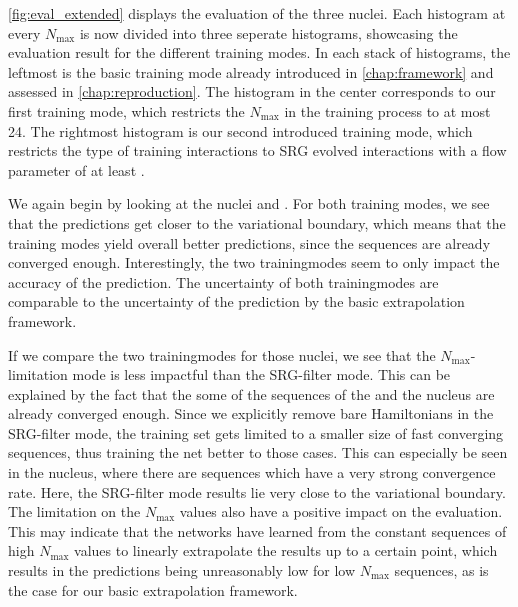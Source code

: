 \autoref{fig:eval_extended} displays the evaluation of the three nuclei. Each histogram at every $N_\mathrm{max}$ is now divided into three seperate histograms, showcasing the evaluation result for the different training modes. In each stack of histograms, the leftmost is the basic training mode already introduced in \autoref{chap:framework} and assessed in \autoref{chap:reproduction}. The histogram in the center corresponds to our first training mode, which restricts the $N_\mathrm{max}$ in the training process to at most 24. The rightmost histogram is our second introduced training mode, which restricts the type of training interactions to SRG evolved interactions with a flow parameter of at least .

We again begin by looking at the nuclei  and . For both training modes, we see that the predictions get closer to the variational boundary, which means that the training modes yield overall better predictions, since the sequences are already converged enough. Interestingly, the two trainingmodes seem to only impact the accuracy of the prediction. The uncertainty of both trainingmodes are comparable to the uncertainty of the prediction by the basic extrapolation framework.

If we compare the two trainingmodes for those nuclei, we see that the $N_\mathrm{max}$-limitation mode is less impactful than the SRG-filter mode. This can be explained by the fact that the some of the sequences of the  and the  nucleus are already converged enough. Since we explicitly remove bare Hamiltonians in the SRG-filter mode, the training set gets limited to a smaller size of fast converging sequences, thus training the net better to those cases. This can especially be seen in the  nucleus, where there are sequences which have a very strong convergence rate. Here, the SRG-filter mode results lie very close to the variational boundary. The limitation on the $N_\mathrm{max}$ values also have a positive impact on the evaluation. This may indicate that the networks have learned from the constant sequences of high $N_\mathrm{max}$ values to linearly extrapolate the results up to a certain point, which results in the predictions being unreasonably low for low $N_\mathrm{max}$ sequences, as is the case for our basic extrapolation framework.

